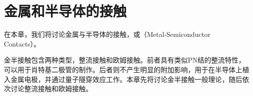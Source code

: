 \chapter{金属和半导体的接触}
在本章，我们将讨论金属与半导体的接触，或（Metal-Semiconductor Contacts）。

金半接触包含两种类型，整流接触和欧姆接触。前者具有类似PN结的整流特性，可以用于肖特基二极管的制作。后者则不产生明显的附加影响，用于在半导体上植入金属电极，并通过量子隧穿效应工作。本章先将讨论金半接触一般理论，随后依次讨论整流接触和欧姆接触。


